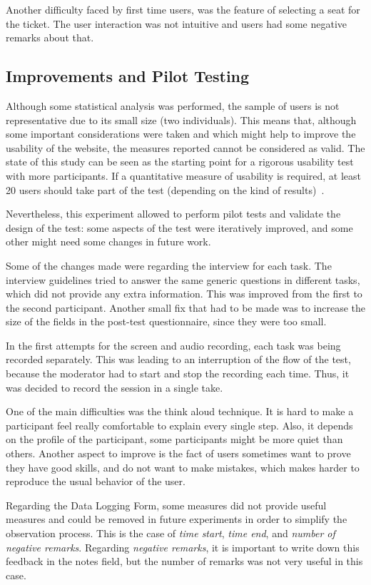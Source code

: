 \documentclass[a4paper]{article}
\begin{document}
Another difficulty faced by first time users, was the feature of selecting a seat for the ticket. The user interaction was not intuitive and users had some negative remarks about that.

\subsection{Improvements and Pilot Testing}

Although some statistical analysis was performed, the sample of users is not representative due to its small size (two individuals).
This means that, although some important considerations were taken and which might help to improve the usability of the website, the measures reported cannot be considered as valid. 
The state of this study can be seen as the starting point for a rigorous usability test with more participants. If a quantitative measure of usability is required, at least 20 users should take part of the test (depending on the kind of results)~\citep{nielsen2012many}.

Nevertheless, this experiment allowed to perform pilot tests and validate the design of the test: some aspects of the test were iteratively improved, and some other might need some changes in future work.

Some of the changes made were regarding the interview for each task.
The interview guidelines tried to answer the same generic questions in different tasks, which did not provide any extra information.
This was improved from the first to the second participant.
Another small fix that had to be made was to increase the size of the fields in the post-test questionnaire, since they were too small.

In the first attempts for the screen and audio recording, each task was being recorded separately. This was leading to an interruption of the flow of the test, because the moderator had to start and stop the recording each time. Thus, it was decided to record the session in a single take.

One of the main difficulties was the think aloud technique. It is hard to make a participant feel really comfortable to explain every single step. Also, it depends on the profile of the participant, some participants might be more quiet than others. Another aspect to improve is the fact of users sometimes want to prove they have good skills, and do not want to make mistakes, which makes harder to reproduce the usual behavior of the user.

Regarding the Data Logging Form, some measures did not provide useful measures and could be removed in future experiments in order to simplify the observation process. This is the case of \emph{time start}, \emph{time end}, and \emph{number of negative remarks}. Regarding \emph{negative remarks}, it is important to write down this feedback in the notes field, but the number of remarks was not very useful in this case.
\end{document}
